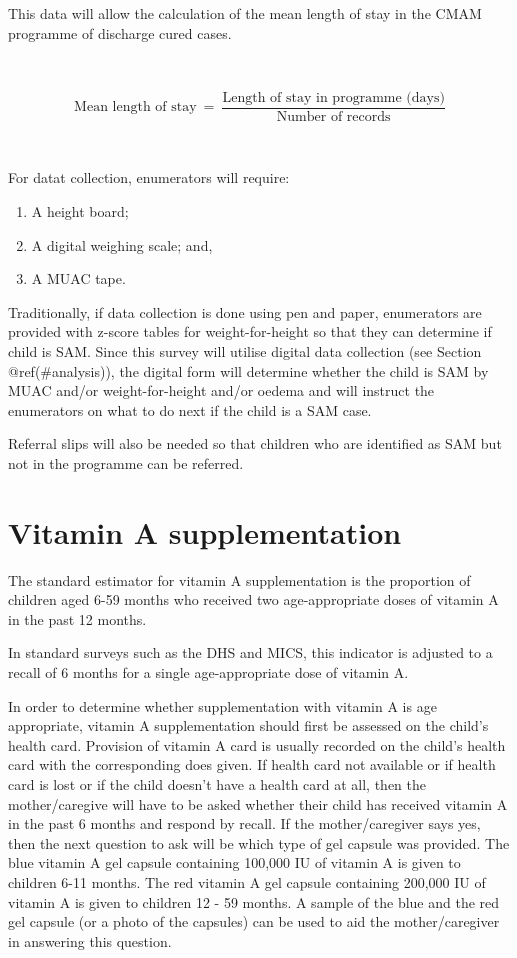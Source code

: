 \documentclass[12pt,a4paper]{book}
\theoremstyle{definition}
\theoremstyle{definition}
\theoremstyle{definition}
\theoremstyle{remark}
\begin{document}
This data will allow the calculation of the mean length of stay in the
CMAM programme of discharge cured cases.

~

\[ \text{Mean length of stay} ~ = ~ \frac{\text{Length of stay in programme (days)}}{\text{Number of records}} \]

~

For datat collection, enumerators will require:

\begin{enumerate}
\def\labelenumi{\arabic{enumi}.}
\item
  A height board;
\item
  A digital weighing scale; and,
\item
  A MUAC tape.
\end{enumerate}

Traditionally, if data collection is done using pen and paper,
enumerators are provided with z-score tables for weight-for-height so
that they can determine if child is SAM. Since this survey will utilise
digital data collection (see Section @ref(\#analysis)), the digital form
will determine whether the child is SAM by MUAC and/or weight-for-height
and/or oedema and will instruct the enumerators on what to do next if
the child is a SAM case.

Referral slips will also be needed so that children who are identified
as SAM but not in the programme can be referred.

\hypertarget{vitamin-a-supplementation}{%
\section{Vitamin A supplementation}\label{vitamin-a-supplementation}}

The standard estimator for vitamin A supplementation is the proportion
of children aged 6-59 months who received two age-appropriate doses of
vitamin A in the past 12 months.

In standard surveys such as the DHS and MICS, this indicator is adjusted
to a recall of 6 months for a single age-appropriate dose of vitamin A.

In order to determine whether supplementation with vitamin A is age
appropriate, vitamin A supplementation should first be assessed on the
child's health card. Provision of vitamin A card is usually recorded on
the child's health card with the corresponding does given. If health
card not available or if health card is lost or if the child doesn't
have a health card at all, then the mother/caregive will have to be
asked whether their child has received vitamin A in the past 6 months
and respond by recall. If the mother/caregiver says yes, then the next
question to ask will be which type of gel capsule was provided. The blue
vitamin A gel capsule containing 100,000 IU of vitamin A is given to
children 6-11 months. The red vitamin A gel capsule containing 200,000
IU of vitamin A is given to children 12 - 59 months. A sample of the
blue and the red gel capsule (or a photo of the capsules) can be used to
aid the mother/caregiver in answering this question.
\end{document}
